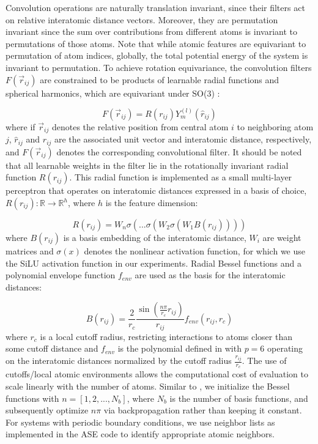 \documentclass[11pt]{article}
\providecommand{\mathds}{\mathbb}%
\begin{document}
Convolution operations are naturally translation invariant, since their filters act on relative interatomic distance vectors. Moreover, they are permutation invariant since the sum over contributions from different atoms is invariant to permutations of those atoms. Note that while atomic features are equivariant to permutation of atom indices, globally, the total potential energy of the system is invariant to permutation. To achieve rotation equivariance, the convolution filters $F(\vec{r}_{ij})$ are constrained to be products of learnable radial functions and spherical harmonics, which are equivariant under SO(3) \cite{thomas2018tensor}:
 
\begin{equation}
    F(\vec{r}_{ij}) = R(r_{ij}) Y_m^{(l)}(\hat{r}_{ij})  
\end{equation}
where if $\vec{r}_{ij}$ denotes the relative position from central atom $i$ to neighboring atom $j$, $\hat{r}_{ij}$ and $r_{ij}$ are the associated unit vector and interatomic distance, respectively, and $F(\vec{r}_{ij})$ denotes the corresponding convolutional filter. It should be noted that all learnable weights in the filter lie in the rotationally invariant radial function $R(r_{ij})$. This radial function is implemented as a small multi-layer perceptron that operates on interatomic distances expressed in a basis of choice, $R(r_{ij}): \mathds{R} \rightarrow \mathds{R}^{h}$, where $h$ is the feature dimension: 

\begin{equation}
    R(r_{ij}) = W_n\sigma( ... \sigma(W_2\sigma(W_1 B(r_{ij}))))
\end{equation}
where $B(r_{ij})$ is a basis embedding of the interatomic distance, $W_i$ are weight matrices and $\sigma(x)$ denotes the nonlinear activation function, for which we use the SiLU activation function \cite{hendrycks2016gaussian} in our experiments. Radial Bessel functions and a polynomial envelope function $f_{env}$ \cite{klicpera2020directional} are used as the basis for the interatomic distances: 

\begin{equation}
    B(r_{ij})= \frac{2}{r_c} \frac{\sin(\frac{n\pi}{r_c}r_{ij})}{r_{ij}} f_{env}(r_{ij}, r_c)
\end{equation} 
where $r_c$ is a local cutoff radius, restricting interactions to atoms closer than some cutoff distance and $f_{env}$ is the polynomial defined in \cite{klicpera2020directional} with $p=6$ operating on the interatomic distances normalized by the cutoff radius $\frac{r_{ij}}{r_c}$. The use of cutoffs/local atomic environments allows the computational cost of evaluation to scale linearly with the number of atoms. Similar to \cite{klicpera2020directional}, we initialize the Bessel functions with $n = [1, 2, ..., N_{b}]$, where $N_b$ is the number of basis functions, and subsequently optimize $n \pi$ via backpropagation rather than keeping it constant. For systems with periodic boundary conditions, we use neighbor lists as implemented in the ASE code \cite{Hjorth_Larsen_2017} to identify appropriate atomic neighbors.\\
\end{document}

